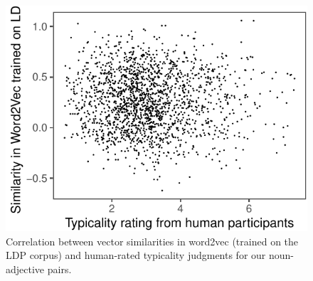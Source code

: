 \documentclass[10pt, letterpaper]{article}
\newenvironment{CodeChunk}{}{}
\begin{document}
\begin{CodeChunk}
\begin{figure}[tb]

{\centering \includegraphics{figs/word2vec1-1} 

}

\caption[Correlation between vector similarities in word2vec (trained on the LDP corpus) and human-rated typicality judgments for our noun-adjective pairs]{Correlation between vector similarities in word2vec (trained on the LDP corpus) and human-rated typicality judgments for our noun-adjective pairs.}\label{fig:word2vec1}
\end{figure}
\end{CodeChunk}
\end{document}
